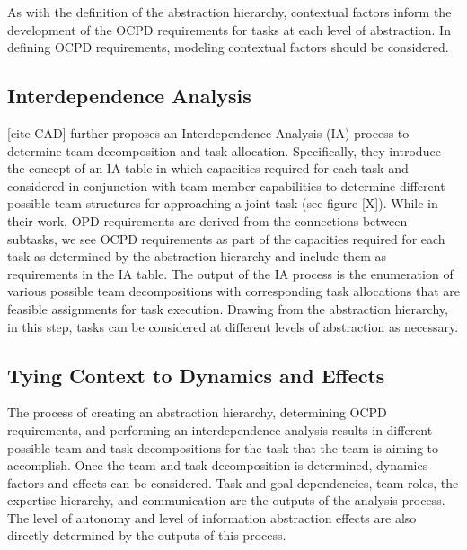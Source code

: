 \documentclass[letterpaper, 10 pt, conference]{ieeeconf}  %
\theoremstyle{definition}
\begin{document}
As with the definition of the abstraction hierarchy, contextual factors inform the development of the OCPD requirements for tasks at each level of abstraction. In defining OCPD requirements, modeling contextual factors should be considered. 

\subsection{Interdependence Analysis}
\label{sec:IA}
[cite CAD] further proposes an Interdependence Analysis (IA) process to determine team decomposition and task allocation. Specifically, they introduce the concept of an IA table in which capacities required for each task and considered in conjunction with team member capabilities to determine different possible team structures for approaching a joint task (see figure [X]). While in their work, OPD requirements are derived from the connections between subtasks, we see OCPD requirements as part of the capacities required for each task as determined by the abstraction hierarchy and include them as requirements in the IA table. The output of the IA process is the enumeration of various possible team decompositions with corresponding task allocations that are feasible assignments for task execution. Drawing from the abstraction hierarchy, in this step, tasks can be considered at different levels of abstraction as necessary. 

\subsection{Tying Context to Dynamics and Effects}
The process of creating an abstraction hierarchy, determining OCPD requirements, and performing an interdependence analysis results in different possible team and task decompositions for the task that the team is aiming to accomplish. Once the team and task decomposition is determined, dynamics factors and effects can be considered. Task and goal dependencies, team roles, the expertise hierarchy, and communication are the outputs of the analysis process. The level of autonomy and level of information abstraction effects are also directly determined by the outputs of this process. 

\end{document}
